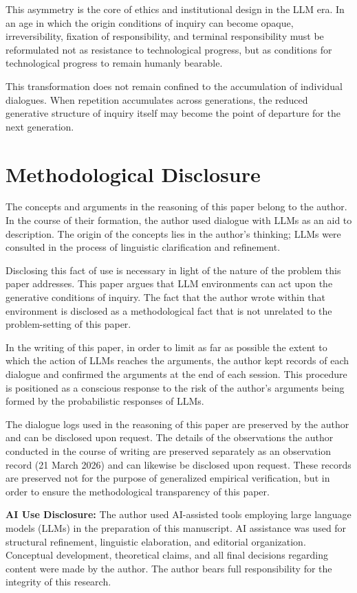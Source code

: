 \documentclass[12pt]{article}
\begin{document}
This asymmetry is the core of ethics and institutional design in the LLM era. In an age in which the origin conditions of inquiry can become opaque, irreversibility, fixation of responsibility, and terminal responsibility must be reformulated not as resistance to technological progress, but as conditions for technological progress to remain humanly bearable.

This transformation does not remain confined to the accumulation of individual dialogues. When repetition accumulates across generations, the reduced generative structure of inquiry itself may become the point of departure for the next generation.

\section*{Methodological Disclosure}

The concepts and arguments in the reasoning of this paper belong to the author. In the course of their formation, the author used dialogue with LLMs as an aid to description. The origin of the concepts lies in the author's thinking; LLMs were consulted in the process of linguistic clarification and refinement.

Disclosing this fact of use is necessary in light of the nature of the problem this paper addresses. This paper argues that LLM environments can act upon the generative conditions of inquiry. The fact that the author wrote within that environment is disclosed as a methodological fact that is not unrelated to the problem-setting of this paper.

In the writing of this paper, in order to limit as far as possible the extent to which the action of LLMs reaches the arguments, the author kept records of each dialogue and confirmed the arguments at the end of each session. This procedure is positioned as a conscious response to the risk of the author's arguments being formed by the probabilistic responses of LLMs.

The dialogue logs used in the reasoning of this paper are preserved by the author and can be disclosed upon request. The details of the observations the author conducted in the course of writing are preserved separately as an observation record (21 March 2026) and can likewise be disclosed upon request. These records are preserved not for the purpose of generalized empirical verification, but in order to ensure the methodological transparency of this paper.

\noindent\textbf{AI Use Disclosure:} The author used AI-assisted tools employing large language models (LLMs) in the preparation of this manuscript. AI assistance was used for structural refinement, linguistic elaboration, and editorial organization. Conceptual development, theoretical claims, and all final decisions regarding content were made by the author. The author bears full responsibility for the integrity of this research.
\end{document}
